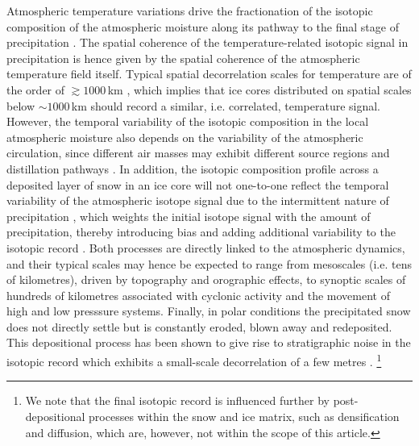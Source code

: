 \documentclass[cp, manuscript, draft]{copernicus}
\begin{document}
Atmospheric temperature variations drive the fractionation of the isotopic
composition of the atmospheric moisture along its pathway to the final stage of
precipitation \citep{Dansgaard1964,Jouzel1984}. The spatial coherence
of the temperature-related isotopic signal in precipitation is hence given by
the spatial coherence of the atmospheric temperature field itself. Typical
spatial decorrelation scales for temperature are of the order of
$\gtrsim1000$\,km \citep{Jones1997}, which implies that ice cores distributed on
spatial scales below $\sim 1000$\,km should record a similar, i.e. correlated,
temperature signal. However, the temporal variability of the isotopic
composition in the local atmospheric moisture also depends on the variability of
the atmospheric circulation, since different air masses may exhibit different
source regions and distillation pathways \citep{Schlosser2004,Sodemann2008a,
Birks2009,Kuttel2012}. In addition, the isotopic composition profile across a
deposited layer of snow in an ice core will not one-to-one reflect the temporal
variability of the atmospheric isotope signal due to the intermittent nature of
precipitation \citep{Schleiss2015}, which weights the
initial isotope signal with the amount of precipitation, thereby introducing
bias \citep{Steig1994,Laepple2011a} and adding additional variability to
the isotopic record \citep{Persson2011,Casado2019}. Both processes are directly
linked to the atmospheric dynamics, and their typical scales may hence be
expected to range from mesoscales (i.e. tens of kilometres), driven by
topography and orographic effects, to synoptic scales of hundreds of kilometres
associated with cyclonic activity and the movement of high and low presssure
systems. Finally, in polar conditions the precipitated snow does not directly
settle but is constantly eroded, blown away and redeposited. This depositional
process has been shown to give rise to stratigraphic noise in the isotopic
record \citep{Fisher1985,Munch2016} which exhibits a small-scale decorrelation
of a few metres \citep{Munch2016}.%
\footnote{We note that the final isotopic record is influenced further by
  post-depositional processes within the snow and ice matrix, such as
  densification and diffusion, which are, however, not within the scope of this
  article.}
\end{document}
